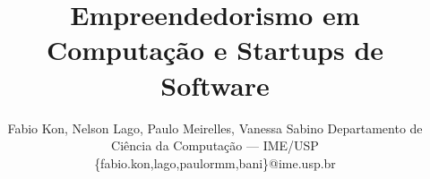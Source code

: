 \documentclass[brazil]{JAImod}
\begin{document}
\date{}

\title{Empreendedorismo em Computação e Startups de Software}

\author{Fabio Kon, Nelson Lago, Paulo Meirelles, Vanessa Sabino
Departamento de Ciência da Computação --- IME/USP
\{fabio.kon,lago,paulormm,bani\}@ime.usp.br
}

\maketitle















\end{document}
